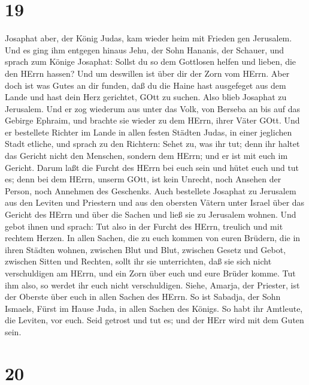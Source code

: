 \hypertarget{section-18}{%
\section{19}\label{section-18}}

 Josaphat aber, der König Judas, kam wieder heim mit Frieden
gen Jerusalem.  Und es ging ihm entgegen hinaus Jehu, der
Sohn Hananis, der Schauer, und sprach zum Könige Josaphat: Sollst du so
dem Gottlosen helfen und lieben, die den HErrn hassen? Und um deswillen
ist über dir der Zorn vom HErrn.  Aber doch ist was Gutes an
dir funden, daß du die Haine hast ausgefeget aus dem Lande und hast dein
Herz gerichtet, GOtt zu suchen.  Also blieb Josaphat zu
Jerusalem. Und er zog wiederum aus unter das Volk, von Berseba an bis
auf das Gebirge Ephraim, und brachte sie wieder zu dem HErrn, ihrer
Väter GOtt.  Und er bestellete Richter im Lande in allen
festen Städten Judas, in einer jeglichen Stadt etliche,  und
sprach zu den Richtern: Sehet zu, was ihr tut; denn ihr haltet das
Gericht nicht den Menschen, sondern dem HErrn; und er ist mit euch im
Gericht.  Darum laßt die Furcht des HErrn bei euch sein und
hütet euch und tut es; denn bei dem HErrn, unserm GOtt, ist kein
Unrecht, noch Ansehen der Person, noch Annehmen des Geschenks.
 Auch bestellete Josaphat zu Jerusalem aus den Leviten und
Priestern und aus den obersten Vätern unter Israel über das Gericht des
HErrn und über die Sachen und ließ sie zu Jerusalem wohnen. 
Und gebot ihnen und sprach: Tut also in der Furcht des HErrn, treulich
und mit rechtem Herzen.  In allen Sachen, die zu euch
kommen von euren Brüdern, die in ihren Städten wohnen, zwischen Blut und
Blut, zwischen Gesetz und Gebot, zwischen Sitten und Rechten, sollt ihr
sie unterrichten, daß sie sich nicht verschuldigen am HErrn, und ein
Zorn über euch und eure Brüder komme. Tut ihm also, so werdet ihr euch
nicht verschuldigen.  Siehe, Amarja, der Priester, ist der
Oberste über euch in allen Sachen des HErrn. So ist Sabadja, der Sohn
Ismaels, Fürst im Hause Juda, in allen Sachen des Königs. So habt ihr
Amtleute, die Leviten, vor euch. Seid getrost und tut es; und der HErr
wird mit dem Guten sein.

\hypertarget{section-19}{%
\section{20}\label{section-19}}

